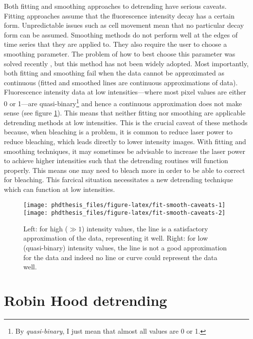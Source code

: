 \documentclass[12pt,]{book}
\let\rmarkdownfootnote\footnote%
\def\footnote{\protect\rmarkdownfootnote}
\theoremstyle{definition}
\theoremstyle{definition}
\theoremstyle{definition}
\theoremstyle{remark}
\begin{document}
Both fitting and smoothing approaches to detrending have serious
caveats. Fitting approaches assume that the fluorescence intensity decay
has a certain form. Unpredictable issues such as cell movement mean that
no particular decay form can be assumed. Smoothing methods do not
perform well at the edges of time series that they are applied to. They
also require the user to choose a smoothing parameter. The problem of
how to best choose this parameter was solved recently \citep{nandb}, but
this method has not been widely adopted. Most importantly, both fitting
and smoothing fail when the data cannot be approximated as continuous
(fitted and smoothed lines are continuous approximations of data).
Fluorescence intensity data at low intensities---where most pixel values
are either 0 or 1---are quasi-binary\footnote{By \emph{quasi-binary}, I
  just mean that almost all values are 0 or 1.} and hence a continuous
approximation does not make sense (see figure
\ref{fig:fit-smooth-caveats}). This means that neither fitting nor
smoothing are applicable detrending methods at low intensities. This is
the crucial caveat of these methods because, when bleaching is a
problem, it is common to reduce laser power to reduce bleaching, which
leads directly to lower intensity images. With fitting and smoothing
techniques, it may sometimes be advisable to increase the laser power to
achieve higher intensities such that the detrending routines will
function properly. This means one may need to bleach more in order to be
able to correct for bleaching. This farcical situation necessitates a
new detrending technique which can function at low intensities.







\begin{figure}

\texttt{[image: phdthesis\_files/figure-latex/fit-smooth-caveats-1]} \texttt{[image: phdthesis\_files/figure-latex/fit-smooth-caveats-2]} \hfill{}

\caption{Left: for high (\(\gg 1\)) intensity
values, the line is a satisfactory approximation of the data,
representing it well. Right: for low (quasi-binary) intensity values,
the line is not a good approximation for the data and indeed no line or
curve could represent the data well.}\label{fig:fit-smooth-caveats}
\end{figure}

\section{Robin Hood detrending}\label{robin-hood-detrending}
\end{document}

